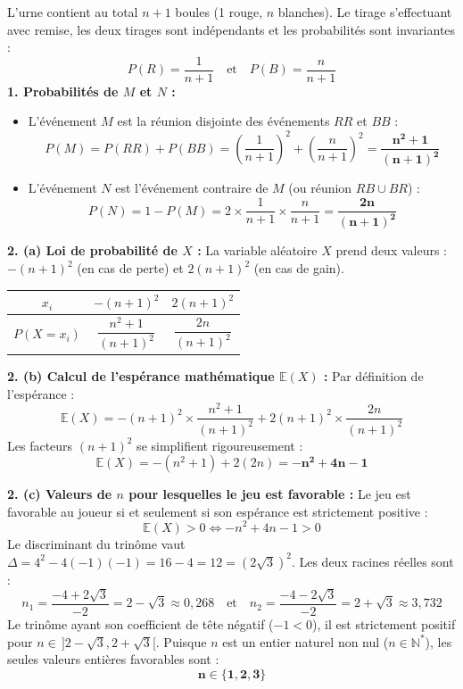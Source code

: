 \documentclass[11pt,a4paper]{article}
\newcommand{\N}{\mathbb{N}}
\newcommand{\E}{\mathbb{E}}
\begin{document}
\begin{correctionbox}
L'urne contient au total $n + 1$ boules (1 rouge, $n$ blanches).
Le tirage s'effectuant avec remise, les deux tirages sont indépendants et les probabilités sont invariantes :
\[
P(R) = \frac{1}{n+1} \quad \text{et} \quad P(B) = \frac{n}{n+1}
\]
\textbf{1. Probabilités de $M$ et $N$ :}
\begin{itemize}[label=$\bullet$]
    \item L'événement $M$ est la réunion disjointe des événements $RR$ et $BB$ :
    \[
    P(M) = P(RR) + P(BB) = \left(\frac{1}{n+1}\right)^2 + \left(\frac{n}{n+1}\right)^2 = \mathbf{\frac{n^2 + 1}{(n+1)^2}}
    \]
    \item L'événement $N$ est l'événement contraire de $M$ (ou réunion $RB \cup BR$) :
    \[
    P(N) = 1 - P(M) = 2 \times \frac{1}{n+1} \times \frac{n}{n+1} = \mathbf{\frac{2n}{(n+1)^2}}
    \]
\end{itemize}

\textbf{2. (a) Loi de probabilité de $X$ :}
La variable aléatoire $X$ prend deux valeurs : $-(n+1)^2$ (en cas de perte) et $2(n+1)^2$ (en cas de gain).
\begin{center}
\renewcommand{\arraystretch}{1.5}
\begin{tabular}{|c|c|c|}
    \hline
    $x_i$ & $-(n+1)^2$ & $2(n+1)^2$ \\
    \hline
    $P(X = x_i)$ & $\dfrac{n^2 + 1}{(n+1)^2}$ & $\dfrac{2n}{(n+1)^2}$ \\
    \hline
\end{tabular}
\end{center}

\textbf{2. (b) Calcul de l'espérance mathématique $\E(X)$ :}
Par définition de l'espérance :
\[
\E(X) = -(n+1)^2 \times \frac{n^2 + 1}{(n+1)^2} + 2(n+1)^2 \times \frac{2n}{(n+1)^2}
\]
Les facteurs $(n+1)^2$ se simplifient rigoureusement :
\[
\E(X) = -(n^2 + 1) + 2(2n) = \mathbf{-n^2 + 4n - 1}
\]

\textbf{2. (c) Valeurs de $n$ pour lesquelles le jeu est favorable :}
Le jeu est favorable au joueur si et seulement si son espérance est strictement positive :
\[
\E(X) > 0 \iff -n^2 + 4n - 1 > 0
\]
Le discriminant du trinôme vaut $\Delta = 4^2 - 4(-1)(-1) = 16 - 4 = 12 = (2\sqrt{3})^2$.
Les deux racines réelles sont :
\[
n_1 = \frac{-4 + 2\sqrt{3}}{-2} = 2 - \sqrt{3} \approx 0{,}268 \quad \text{et} \quad n_2 = \frac{-4 - 2\sqrt{3}}{-2} = 2 + \sqrt{3} \approx 3{,}732
\]
Le trinôme ayant son coefficient de tête négatif ($-1 < 0$), il est strictement positif pour $n \in \,]2-\sqrt{3}, 2+\sqrt{3}[$.
Puisque $n$ est un entier naturel non nul ($n \in \N^*$), les seules valeurs entières favorables sont :
\[
\mathbf{n \in \{1, 2, 3\}}
\]


\end{correctionbox}
\end{document}
